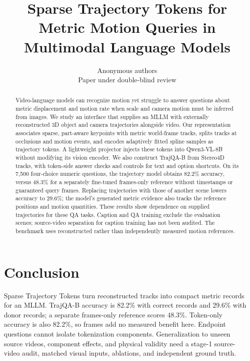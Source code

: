 \documentclass{article} %
\title{Sparse Trajectory Tokens for Metric Motion Queries in Multimodal Language Models}
\author{Anonymous authors \\
Paper under double-blind review
}
\begin{document}
\maketitle

\begin{abstract}
Video-language models can recognize motion yet struggle to answer questions about
metric displacement and motion rate when scale and camera motion must be inferred from
images. We study an interface that supplies an MLLM with externally reconstructed
3D object and camera trajectories alongside video. Our representation associates
sparse, part-aware keypoints with metric world-frame tracks, splits tracks at
occlusions and motion events, and encodes adaptively fitted spline samples as
trajectory tokens. A lightweight projector injects these tokens into
Qwen3-VL-8B without modifying its vision encoder. We also construct TrajQA-B
from Stereo4D tracks, with token-side answer checks and controls for text and
option shortcuts. On its 7,500 four-choice numeric
questions, the trajectory model obtains 82.2\% accuracy, versus 48.3\% for a
separately fine-tuned frames-only reference without timestamps or guaranteed query frames. Replacing trajectories with those of another
scene lowers accuracy to 29.6\%; the model's generated metric evidence also
tracks the reference positions and motion quantities. These results show
dependence on supplied trajectories for these QA tasks. Caption and QA training
exclude the evaluation scenes; source-video separation for caption training
has not been audited. The benchmark uses reconstructed rather than independently
measured motion references.
\end{abstract}









\section{Conclusion}
\label{sec:conclusion}
Sparse Trajectory Tokens turn reconstructed tracks into compact metric records for an MLLM. TrajQA-B accuracy is 82.2\% with correct records and 29.6\% with donor records; a separate frames-only reference scores 48.3\%. Token-only accuracy is also 82.2\%, so frames add no measured benefit here. Endpoint questions cannot isolate tokenization components. Generalization to unseen source videos, component effects, and physical validity need a stage-1 source-video audit, matched visual inputs, ablations, and independent ground truth.
\end{document}
